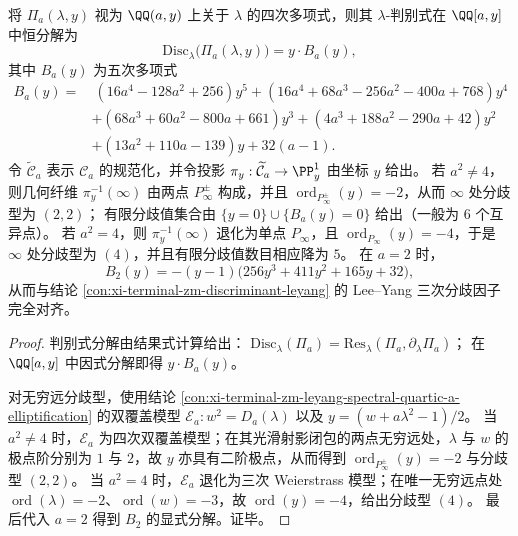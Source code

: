 \begin{conclusion}\label{con:xi-terminal-zm-leyang-spectral-quartic-a-discriminant-branch}
将 \(\Pi_a(\lambda,y)\) 视为 \(\QQ(a,y)\) 上关于 \(\lambda\) 的四次多项式，则其 \(\lambda\)-判别式在 \(\QQ[a,y]\) 中恒分解为
\[
\mathrm{Disc}_{\lambda}\bigl(\Pi_a(\lambda,y)\bigr)=y\cdot B_a(y),
\]
其中 \(B_a(y)\) 为五次多项式
\[
\begin{aligned}
B_a(y)=&\ (16a^4-128a^2+256)y^5+(16a^4+68a^3-256a^2-400a+768)y^4\\
&+(68a^3+60a^2-800a+661)y^3+(4a^3+188a^2-290a+42)y^2\\
&+(13a^2+110a-139)y+32(a-1).
\end{aligned}
\]
令 \(\widetilde{\mathcal C}_a\) 表示 \(\mathcal C_a\) 的规范化，并令投影 \(\pi_y:\widetilde{\mathcal C}_a\to\PP^1_y\) 由坐标 \(y\) 给出。
若 \(a^2\neq 4\)，则几何纤维 \(\pi_y^{-1}(\infty)\) 由两点 \(P_\infty^\pm\) 构成，并且
\(
\operatorname{ord}_{P_\infty^\pm}(y)=-2
\)，从而 \(\infty\) 处分歧型为 \((2,2)\)；
有限分歧值集合由
\(
\{y=0\}\cup\{B_a(y)=0\}
\)
给出（一般为 \(6\) 个互异点）。
若 \(a^2=4\)，则 \(\pi_y^{-1}(\infty)\) 退化为单点 \(P_\infty\)，且
\(
\operatorname{ord}_{P_\infty}(y)=-4
\)，于是 \(\infty\) 处分歧型为 \((4)\)，并且有限分歧值数目相应降为 \(5\)。
在 \(a=2\) 时，
\[
B_2(y)=-(y-1)\bigl(256y^3+411y^2+165y+32\bigr),
\]
从而与结论 \ref{con:xi-terminal-zm-discriminant-leyang} 的 Lee--Yang 三次分歧因子完全对齐。
\end{conclusion}
\begin{proof}
判别式分解由结果式计算给出：
\(
\mathrm{Disc}_{\lambda}(\Pi_a)=\mathrm{Res}_{\lambda}(\Pi_a,\partial_\lambda\Pi_a)
\)；
在 \(\QQ[a,y]\) 中因式分解即得 \(y\cdot B_a(y)\)。
\par
对无穷远分歧型，使用结论 \ref{con:xi-terminal-zm-leyang-spectral-quartic-a-elliptification} 的双覆盖模型
\(
\mathcal E_a:w^2=D_a(\lambda)
\)
以及
\(
y=(w+a\lambda^2-1)/2
\)。
当 \(a^2\neq 4\) 时，\(\mathcal E_a\) 为四次双覆盖模型；在其光滑射影闭包的两点无穷远处，\(\lambda\) 与 \(w\) 的极点阶分别为 \(1\) 与 \(2\)，故 \(y\) 亦具有二阶极点，从而得到 \(\operatorname{ord}_{P_\infty^\pm}(y)=-2\) 与分歧型 \((2,2)\)。
当 \(a^2=4\) 时，\(\mathcal E_a\) 退化为三次 Weierstrass 模型；在唯一无穷远点处 \(\operatorname{ord}(\lambda)=-2\)、\(\operatorname{ord}(w)=-3\)，故 \(\operatorname{ord}(y)=-4\)，给出分歧型 \((4)\)。
最后代入 \(a=2\) 得到 \(B_2\) 的显式分解。证毕。
\end{proof}

